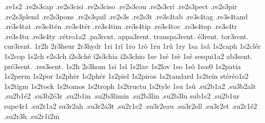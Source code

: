 {                    .re1s2
                    .re2s3cap
                    .re2s3cisi %
                    .re2s3ciso %
                    .re2s3cou
                    .re2s3cri
                    .re2s3pect
                    .re2s3pir
                    .re2s3plend
                    .re2s3pons
                    .re2s3quil
                    .re2s3s
                    .re2s3t
                    .re3s4tab
                    .re3s4tag
                    .re3s4tand
                    .re3s4tat
                    .re3s4t\'en
                    .re3s4t\'er
                    .re3s4tim
                    .re3s4tip
                    .re3s4toc
                    .re3s4top
                    .re3s4tr
                    .re3s4tu
                    .re3s4ty
                    .r\'etro1a2
    .pa3rent.
   appa3rent.
transpa3rent.
    \'e3rent.
    tor3rent.
    cur3rent.
1r2h
                    2r3heur
                    2r3hydr
1ri
1r\^i
1ro
1r\^o
1ru
1r\^u
1ry
1sa
1s\^a
                    1s2caph
                    1s2cl\'er
                    1s2cop
 1s2ch
e2s3ch
i2s3ch\'e
i2s3chia
i2s3chio
1se
1s\'e
1s\`e
1s\^e
                    sesqui1a2
   ab3sent.
pr\'e3sent.
 .res3sent.
1s2h
                    2s3hom
1si
1s\^i
                    1s2lav
                    1s2lov
1so
1s\^o
1s\oe0 %
                    1s2patia
                    1s2perm
                    1s2por
                    1s2ph\`er
                    1s2ph\'er
                    1s2piel
                    1s2piros
                    1s2tandard
                    1s2tein
                    st\'er\'eo1s2
                    1s2tigm
                    1s2tock
                    1s2tomos
                    1s2troph
                    1s2tructu
                    1s2tyle
1su
1s\^u
                    .su2b1a2
                    .su3b2alt
                    .su2b1\'e2
                    .su3b2\'e3r
                    .su2b1in
                    .su2b3limin
                    .su2b3lin
                    .su2b3lu
                    sub1s2
                    .su2b1ur
                    supe4r1
                    .su2r1a2
                    su3r2ah
                    .su3r2a3t
                    .su2r1e2
                    .su3r2eau
                    .su3r2ell
                    .su3r2et
                    .su2r1\'e2
                    .su2r3h
                    .su2r1i2m
}
